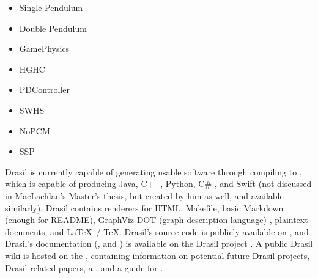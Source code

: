 


\begin{itemize}

      \item Single Pendulum

      \item Double Pendulum

      \item GamePhysics

      \item HGHC

      \item PDController

      \item SWHS

      \item NoPCM

      \item SSP

\end{itemize}

Drasil is currently capable of generating usable software through compiling to
, which is capable of producing Java, C++, Python, C\#
\cite{MacLachlan2020}, and Swift (not discussed in MacLachlan's Master's thesis,
but created by him as well, and available similarly). Drasil contains renderers
for HTML, Makefile, basic Markdown (enough for README), GraphViz DOT (graph
description language) \cite{Gansner1993}, plaintext documents, and \LaTeX\ /
\TeX. Drasil's source code is publicly available on
, and Drasil's
documentation
(,
and
)
is available on the Drasil project
. A public Drasil
wiki is hosted on the , containing information
on potential future Drasil projects, Drasil-related papers, a
, and a
guide for .

